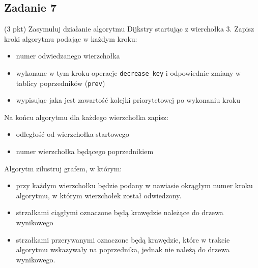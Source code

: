 \documentclass{article}
\begin{document}
\subsection*{Zadanie 7}
(3 pkt) Zasymuluj działanie algorytmu Dijkstry startując z wierchołka 3. Zapisz kroki algorytmu podając w każdym kroku:
\begin{itemize}
    \item numer odwiedzanego wierzchołka
    \item wykonane w tym kroku operacje \verb|decrease_key| i odpowiednie zmiany w tablicy poprzedników (\verb|prev|)
    \item wypisując jaka jest zawartość kolejki priorytetowej po wykonaniu kroku
\end{itemize}
Na końcu algorytmu dla każdego wierzchołka zapisz:
\begin{itemize}
    \item odległość od wierzchołka startowego
    \item numer wierzchołka będącego poprzednikiem
\end{itemize}
Algorytm zilustruj grafem, w którym:
\begin{itemize}
    \item przy każdym wierzchołku będzie podany w nawiasie okrągłym numer kroku algorytmu,
          w którym wierzchołek został odwiedzony.
    \item strzałkami ciągłymi oznaczone będą krawędzie należące do drzewa wynikowego
    \item strzałkami przerywanymi oznaczone będą krawędzie, które w trakcie algorytmu wskazywały
          na poprzednika, jednak nie należą do drzewa wynikowego.
\end{itemize}
\begin{center}
\end{center}
\end{document}
